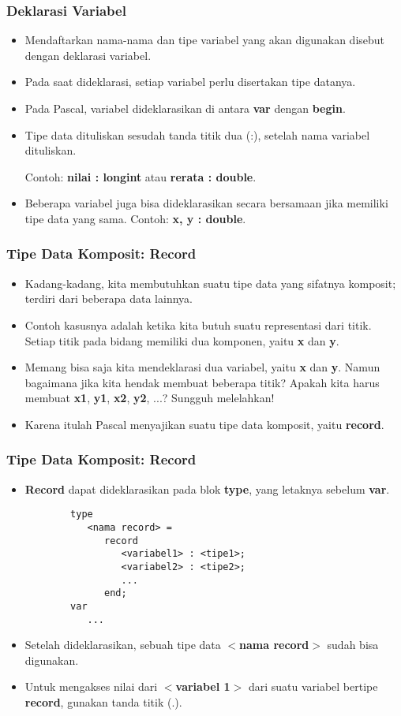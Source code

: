 \documentclass{beamer}
\begin{document}
\begin{frame}
\frametitle{Deklarasi Variabel}
\begin{itemize}
	\item Mendaftarkan nama-nama dan tipe variabel yang akan digunakan disebut dengan deklarasi variabel.
	\item Pada saat dideklarasi, setiap variabel perlu disertakan tipe datanya. 
	\item Pada Pascal, variabel dideklarasikan di antara \textbf{var} dengan \textbf{begin}.
	\item Tipe data dituliskan sesudah tanda titik dua (:), setelah nama variabel dituliskan.
	
	Contoh: \textbf{nilai : longint} atau \textbf{rerata : double}.
	\item Beberapa variabel juga bisa dideklarasikan secara bersamaan jika memiliki tipe data yang sama. Contoh: \textbf{x, y : double}.
\end{itemize}
\end{frame}

\begin{frame}
\frametitle{Tipe Data Komposit: Record}
\begin{itemize}
	\item Kadang-kadang, kita membutuhkan suatu tipe data yang sifatnya komposit; terdiri dari beberapa data lainnya.
	\item Contoh kasusnya adalah ketika kita butuh suatu representasi dari titik. Setiap titik pada bidang memiliki dua komponen, yaitu \textbf{x} dan \textbf{y}.
	\item Memang bisa saja kita mendeklarasi dua variabel, yaitu \textbf{x} dan \textbf{y}. Namun bagaimana jika kita hendak membuat beberapa titik? Apakah kita harus membuat \textbf{x1}, \textbf{y1}, \textbf{x2}, \textbf{y2}, ...? Sungguh melelahkan!
	\item Karena itulah Pascal menyajikan suatu tipe data komposit, yaitu \alert{\textbf{record}}. 
\end{itemize}
\end{frame}

\begin{frame}[fragile]
\frametitle{Tipe Data Komposit: Record}
\begin{itemize}
	\item \textbf{Record} dapat dideklarasikan pada blok \textbf{type}, yang letaknya sebelum \textbf{var}.
	\begin{lstlisting}
		type
		   <nama record> = 
		      record
		         <variabel1> : <tipe1>;
		         <variabel2> : <tipe2>;
		         ...
		      end;
		var
		   ...
	\end{lstlisting}
	\item Setelah dideklarasikan, sebuah tipe data \textbf{$<$nama record$>$} sudah bisa digunakan.
	\item Untuk mengakses nilai dari \textbf{$<$variabel 1$>$} dari suatu variabel bertipe \textbf{record}, gunakan tanda titik (.).
\end{itemize}
\end{frame}
\end{document}
